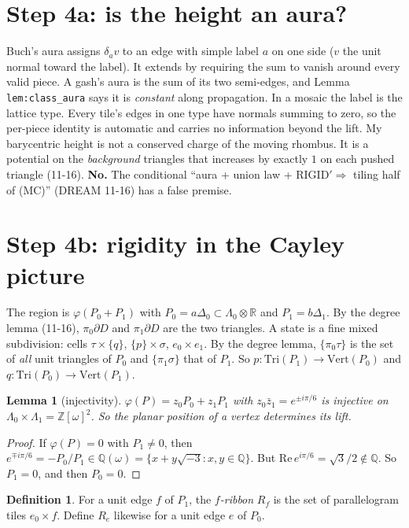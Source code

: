 \documentclass[11pt]{article}
\newtheorem{lemma}[theorem]{Lemma}
\theoremstyle{definition}
\newtheorem{definition}[theorem]{Definition}
\begin{document}
\section{Step 4a: is the height an aura?}
Buch's aura assigns $\delta_a v$ to an edge with simple label $a$ on one side ($v$ the unit normal toward the label). It extends by requiring the
sum to vanish around every valid piece. A gash's aura is the sum of its two semi-edges, and Lemma \texttt{lem:class\_aura} says it is
\emph{constant} along propagation. In a mosaic the label is the lattice type. Every tile's edges in one type have normals summing to zero, so the per-piece identity is
automatic and carries no information beyond the lift. My barycentric height is not a conserved charge of the moving rhombus. It is a
potential on the \emph{background} triangles that increases by exactly $1$ on each pushed triangle (11-16). \textbf{No.} The conditional
``aura + union law + RIGID$'\Rightarrow$ tiling half of (MC)'' (DREAM 11-16) has a false premise.

\section{Step 4b: rigidity in the Cayley picture}
The region is $\varphi(P_0+P_1)$ with $P_0=a\Delta_0\subset\Lambda_0\otimes\mathbb R$ and $P_1=b\Delta_1$. By the degree lemma (11-16),
$\pi_0\partial D$ and $\pi_1\partial D$ are the two triangles. A state is a fine mixed subdivision: cells $\tau\times\{q\}$, $\{p\}\times\sigma$, $e_0\times e_1$.
By the degree lemma, $\{\pi_0\tau\}$ is the set of \emph{all} unit triangles of $P_0$ and $\{\pi_1\sigma\}$ that of $P_1$. So
$p:\mathrm{Tri}(P_1)\to\mathrm{Vert}(P_0)$ and $q:\mathrm{Tri}(P_0)\to\mathrm{Vert}(P_1)$.

\begin{lemma}[injectivity]\label{lem:inj}
$\varphi(P)=z_0P_0+z_1P_1$ with $z_0\bar z_1=e^{\pm i\pi/6}$ is injective on $\Lambda_0\times\Lambda_1=\mathbb Z[\omega]^2$. So the planar
position of a vertex determines its lift.
\end{lemma}
\begin{proof}
If $\varphi(P)=0$ with $P_1\ne0$, then $e^{\mp i\pi/6}=-P_0/P_1\in\mathbb Q(\omega)=\{x+y\sqrt{-3}:x,y\in\mathbb Q\}$. But $\mathrm{Re}\,e^{i\pi/6}=\sqrt3/2\notin\mathbb Q$.
So $P_1=0$, and then $P_0=0$.
\end{proof}

\begin{definition}
For a unit edge $f$ of $P_1$, the \emph{$f$-ribbon} $R_f$ is the set of parallelogram tiles $e_0\times f$. Define $R_e$ likewise for a unit edge $e$ of $P_0$.
\end{definition}
\end{document}
